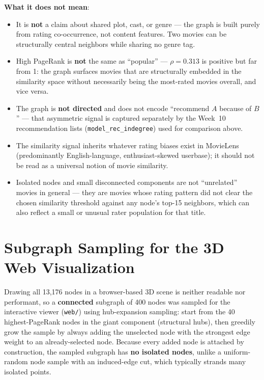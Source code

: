 \documentclass[12pt,a4paper]{article}
\begin{document}
\textbf{What it does not mean}:
\begin{itemize}[nosep]
  \item It is \textbf{not} a claim about shared plot, cast, or genre --- the graph is built purely
    from rating co-occurrence, not content features. Two movies can be structurally central
    neighbors while sharing no genre tag.
  \item High PageRank is \textbf{not} the same as ``popular'' --- $\rho=0.313$ is positive but far
    from 1: the graph surfaces movies that are structurally embedded in the similarity space
    without necessarily being the most-rated movies overall, and vice versa.
  \item The graph is \textbf{not directed} and does not encode ``recommend $A$ because of $B$'' ---
    that asymmetric signal is captured separately by the Week~10 recommendation lists
    (\texttt{model\_rec\_indegree}) used for comparison above.
  \item The similarity signal inherits whatever rating biases exist in MovieLens (predominantly
    English-language, enthusiast-skewed userbase); it should not be read as a universal notion of
    movie similarity.
  \item Isolated nodes and small disconnected components are not ``unrelated'' movies in general
    --- they are movies whose rating pattern did not clear the chosen similarity threshold against
    any node's top-15 neighbors, which can also reflect a small or unusual rater population for
    that title.
\end{itemize}

\section{Subgraph Sampling for the 3D Web Visualization}

Drawing all 13,176 nodes in a browser-based 3D scene is neither readable nor performant, so a
\textbf{connected} subgraph of 400 nodes was sampled for the interactive viewer (\texttt{web/})
using hub-expansion sampling: start from the 40 highest-PageRank nodes in the giant component
(structural hubs), then greedily grow the sample by always adding the unselected node with the
strongest edge weight to an already-selected node. Because every added node is attached by
construction, the sampled subgraph has \textbf{no isolated nodes}, unlike a uniform-random node
sample with an induced-edge cut, which typically strands many isolated points.
\end{document}
